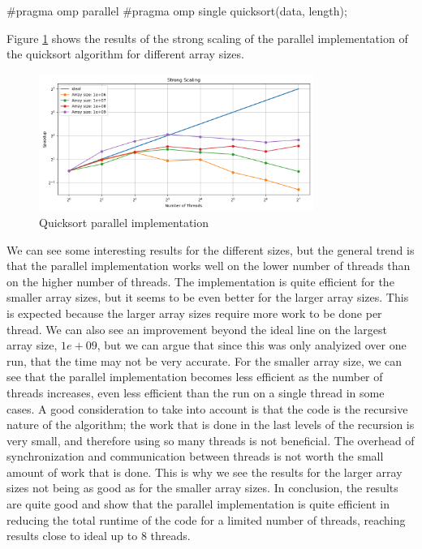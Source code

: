 \documentclass[unicode,11pt,a4paper,oneside,numbers=endperiod,openany]{scrartcl}
\begin{document}
\begin{cppverbatim}
#pragma omp parallel
#pragma omp single
quicksort(data, length);
\end{cppverbatim}
Figure \ref{fig:quicksort} shows the results of the strong scaling of the
parallel implementation of the quicksort algorithm for different array sizes.
\begin{figure}[h]
  \centering
  \includegraphics[width=0.8\textwidth]{../quicksort/strong_scaling_plot.png}
  \caption{Quicksort parallel implementation}
  \label{fig:quicksort}
\end{figure}
We can see some interesting results for the different sizes, but the general
trend is that the parallel implementation works well on the lower number of
threads than on the higher number of threads. The
implementation is quite efficient for the smaller array sizes, but it seems to
be even better for the larger array sizes. 
This is expected because the larger array sizes require more work to be done per
thread.
We can also see an improvement beyond the ideal line on the largest array size, $1e+09$, but
we can argue that since this was only analyized over one run, that the time may not be very
accurate.
For the smaller array size, we can see that the parallel implementation becomes
less efficient as the number of threads increases, even less efficient than the
run on a single thread in some cases.
A good consideration to take into account is that the code is the recursive
nature of the algorithm; the work that is done in the last levels of the recursion is very
small, and therefore using so many threads is not beneficial. The overhead of
synchronization and communication between threads is not worth the small amount
of work that is done.
This is why we see
the results for the larger array sizes not being as good as for the smaller
array sizes.
In conclusion, the results are quite good and show that the
parallel implementation is quite efficient in reducing the total runtime of the
code for a limited number of threads, reaching results close to ideal up to 8
threads.


\end{document}
